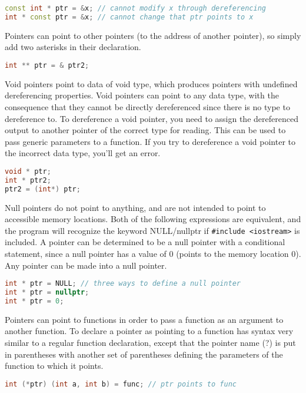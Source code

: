 \documentclass[10pt]{article}
\begin{document}
\begin{lstlisting}[language=C++]
const int * ptr = &x; // cannot modify x through dereferencing
int * const ptr = &x; // cannot change that ptr points to x
\end{lstlisting}

Pointers can point to other pointers (to the address of another pointer), so simply add two asterisks in their declaration.

\begin{lstlisting}[language=C++]
int ** ptr = & ptr2;
\end{lstlisting}

Void pointers point to data of void type, which produces pointers with undefined dereferencing properties. Void pointers can point to any data type, with the consequence that they cannot be directly dereferenced since there is no type to dereference to. To dereference a void pointer, you need to assign the dereferenced output to another pointer of the correct type for reading. This can be used to pass generic parameters to a function. If you try to dereference a void pointer to the incorrect data type, you'll get an error. 

\begin{lstlisting}[language=C++]
void * ptr;
int * ptr2;
ptr2 = (int*) ptr;
\end{lstlisting}

Null pointers do not point to anything, and are not intended to point to accessible memory locations. Both of the following expressions are equivalent, and the program will recognize the keyword NULL/nullptr if \texttt{\#include <iostream>} is included. A pointer can be determined to be a null pointer with a conditional statement, since a null pointer has a value of 0 (points to the memory location 0). Any pointer can be made into a null pointer.

\begin{lstlisting}[language=C++]
int * ptr = NULL; // three ways to define a null pointer
int * ptr = nullptr;
int * ptr = 0;
\end{lstlisting}

Pointers can point to functions in order to pass a function as an argument to another function. To declare a pointer as pointing to a function has syntax very similar to a regular function declaration, except that the pointer name (?) is put in parentheses with another set of parentheses defining the parameters of the function to which it points.

\begin{lstlisting}[language=C++]
int (*ptr) (int a, int b) = func; // ptr points to func
\end{lstlisting}
\end{document}
